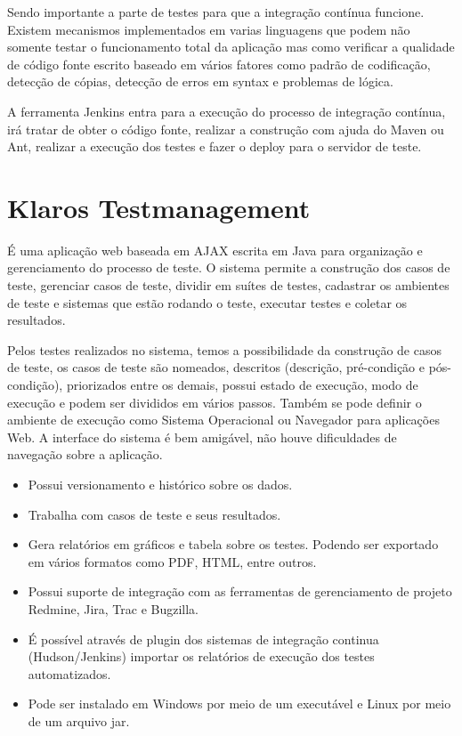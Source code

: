 \documentclass{abnt}
\begin{document}
				Sendo importante a parte de testes para que a integração contínua funcione. Existem mecanismos implementados em
				varias linguagens que podem não somente testar o funcionamento total da aplicação mas como verificar a qualidade de
				código fonte escrito baseado em vários fatores como padrão de codificação, detecção de cópias, detecção de erros em
				syntax e problemas de lógica.
				
				A ferramenta Jenkins entra para a execução do processo de integração contínua, irá tratar de obter o código fonte,
				realizar a construção com ajuda do Maven ou Ant, realizar a execução dos testes e fazer o deploy para o servidor de
				teste.

		\section{Klaros Testmanagement}
		
			É uma aplicação web baseada em AJAX escrita em Java para organização e gerenciamento do processo de teste. O sistema
			permite a construção dos casos de teste, gerenciar casos de teste, dividir em suítes de testes, cadastrar os
			ambientes de teste e sistemas que estão rodando o teste, executar testes e coletar os resultados.
			
			Pelos testes realizados no sistema, temos a possibilidade da construção de casos de teste, os casos de teste são
			nomeados, descritos (descrição, pré-condição e pós-condição), priorizados entre os demais, possui estado de
			execução, modo de execução e podem ser divididos em vários passos. Também se pode definir o ambiente de execução
			como Sistema Operacional ou Navegador para aplicações Web. A interface do sistema é bem amigável, não houve
			dificuldades de navegação sobre a aplicação.
			
			\begin{itemize}
			  \item Possui versionamento e histórico sobre os dados.
			  \item Trabalha com casos de teste e seus resultados.
			  \item Gera relatórios em gráficos e tabela sobre os testes. Podendo ser exportado em vários formatos como PDF,
			  HTML, entre outros.
			  \item Possui suporte de integração com as ferramentas de gerenciamento de projeto Redmine, Jira, Trac e Bugzilla.
			  \item É possível através de plugin dos sistemas de integração continua (Hudson/Jenkins) importar os relatórios de
			  execução dos testes automatizados.
			  \item Pode ser instalado em Windows por meio de um executável e Linux por meio de um arquivo jar.
			\end{itemize}
			
\end{document}
